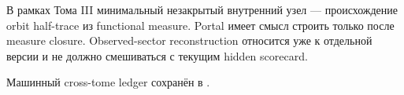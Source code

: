\begin{protocol}
В рамках Тома III минимальный незакрытый внутренний узел --- происхождение
orbit half-trace из functional measure. Portal имеет смысл строить только
после measure closure. Observed-sector reconstruction относится уже к
отдельной версии и не должно смешиваться с текущим hidden scorecard.
\end{protocol}

Машинный cross-tome ledger сохранён в
.